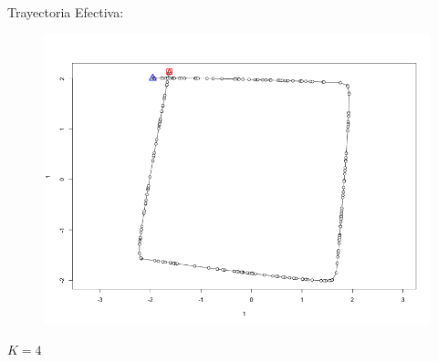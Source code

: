 Trayectoria Efectiva:

\begin{figure}[!htb]
\begin{center}
\includegraphics[width=\linewidth/2]{imagenesTrayectorias/lazocerrado/lazocerrado1.png}
\end{center}
\end{figure}
\FloatBarrier


\pagebreak
$K = 4$


